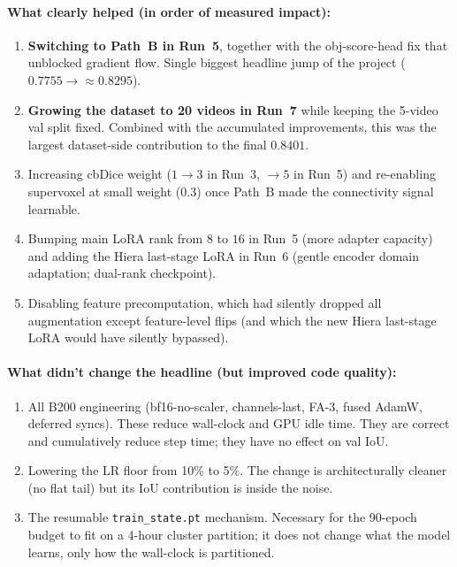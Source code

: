 \documentclass[11pt,a4paper]{article}
\begin{document}
\paragraph{What clearly helped (in order of measured impact):}
\begin{enumerate}[noitemsep,topsep=3pt]
    \item \textbf{Switching to Path~B in Run~5}, together with the
          obj-score-head fix that unblocked gradient flow. Single
          biggest headline jump of the project ($0.7755 \to
          \approx 0.8295$).
    \item \textbf{Growing the dataset to 20 videos in Run~7} while
          keeping the 5-video val split fixed. Combined with the
          accumulated improvements, this was the largest dataset-side
          contribution to the final $0.8401$.
    \item Increasing cbDice weight ($1 \to 3$ in Run~3, $\to 5$ in
          Run~5) and re-enabling supervoxel at small weight ($0.3$)
          once Path~B made the connectivity signal learnable.
    \item Bumping main LoRA rank from $8$ to $16$ in Run~5 (more
          adapter capacity) and adding the Hiera last-stage LoRA in
          Run~6 (gentle encoder domain adaptation; dual-rank
          checkpoint).
    \item Disabling feature precomputation, which had silently dropped
          all augmentation except feature-level flips (and which the
          new Hiera last-stage LoRA would have silently bypassed).
\end{enumerate}

\paragraph{What didn't change the headline (but improved code quality):}
\begin{enumerate}[noitemsep,topsep=3pt]
    \item All B200 engineering (bf16-no-scaler, channels-last, FA-3,
          fused AdamW, deferred syncs). These reduce wall-clock and
          GPU idle time. They are correct and cumulatively reduce
          step time; they have no effect on val IoU.
    \item Lowering the LR floor from 10\% to 5\%. The change is
          architecturally cleaner (no flat tail) but its IoU
          contribution is inside the noise.
    \item The resumable \texttt{train\_state.pt} mechanism. Necessary
          for the 90-epoch budget to fit on a 4-hour cluster
          partition; it does not change what the model learns, only
          how the wall-clock is partitioned.
\end{enumerate}
\end{document}
